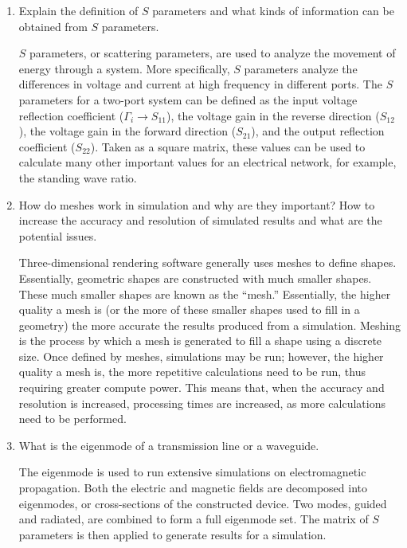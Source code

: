 \documentclass[
	letterpaper, %
	10pt, %
]{CSUniSchoolLabReport}
\begin{document}
\begin{enumerate}

  \item Explain the definition of $S$ parameters and what kinds of information can be obtained from $S$ parameters.

    $S$ parameters, or scattering parameters, are used to analyze the movement of energy through a system. More specifically, $S$ parameters analyze the differences in voltage and current at high frequency in different ports. The $S$ parameters for a two-port system can be defined as the input voltage reflection coefficient ($\Gamma_i\to S_{11}$), the voltage gain in the reverse direction ($S_{12}$), the voltage gain in the forward direction ($S_{21}$), and the output reflection coefficient ($S_{22}$). Taken as a square matrix, these values can be used to calculate many other important values for an electrical network, for example, the standing wave ratio.

  \item How do meshes work in simulation and why are they important? How to increase the accuracy and resolution of simulated results and what are the potential issues.

    Three-dimensional rendering software generally uses meshes to define shapes. Essentially, geometric shapes are constructed with much smaller shapes. These much smaller shapes are known as the ``mesh.'' Essentially, the higher quality a mesh is (or the more of these smaller shapes used to fill in a geometry) the more accurate the results produced from a simulation. Meshing is the process by which a mesh is generated to fill a shape using a discrete size. Once defined by meshes, simulations may be run; however, the higher quality a mesh is, the more repetitive calculations need to be run, thus requiring greater compute power. This means that, when the accuracy and resolution is increased, processing times are increased, as more calculations need to be performed.

  \item What is the eigenmode of a transmission line or a waveguide.

    The eigenmode is used to run extensive simulations on electromagnetic propagation. Both the electric and magnetic fields are decomposed into eigenmodes, or cross-sections of the constructed device. Two modes, guided and radiated, are combined to form a full eigenmode set. The matrix of $S$ parameters is then applied to generate results for a simulation.


\end{enumerate}
\end{document}
